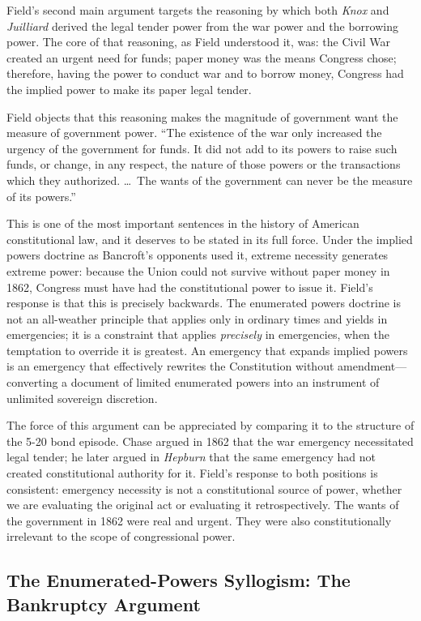 \documentclass[12pt]{article}
\begin{document}
Field's second main argument targets the reasoning by which both
\textit{Knox} and \textit{Juilliard} derived the legal tender power
from the war power and the borrowing power. The core of that reasoning,
as Field understood it, was: the Civil War created an urgent need for
funds; paper money was the means Congress chose; therefore, having the
power to conduct war and to borrow money, Congress had the implied power
to make its paper legal tender.

Field objects that this reasoning makes the magnitude of government
want the measure of government power. ``The existence of the war only
increased the urgency of the government for funds. It did not add to
its powers to raise such funds, or change, in any respect, the nature
of those powers or the transactions which they authorized. \ldots\ The
wants of the government can never be the measure of its powers.''

This is one of the most important sentences in the history of American
constitutional law, and it deserves to be stated in its full force.
Under the implied powers doctrine as Bancroft's opponents used it,
extreme necessity generates extreme power: because the Union could not
survive without paper money in 1862, Congress must have had the
constitutional power to issue it. Field's response is that this is
precisely backwards. The enumerated powers doctrine is not an all-weather
principle that applies only in ordinary times and yields in emergencies;
it is a constraint that applies \textit{precisely} in emergencies,
when the temptation to override it is greatest. An emergency that
expands implied powers is an emergency that effectively rewrites the
Constitution without amendment---converting a document of limited
enumerated powers into an instrument of unlimited sovereign discretion.

The force of this argument can be appreciated by comparing it to the
structure of the 5-20 bond episode. Chase argued in 1862 that the
war emergency necessitated legal tender; he later argued in
\textit{Hepburn} that the same emergency had not created constitutional
authority for it. Field's response to both positions is consistent:
emergency necessity is not a constitutional source of power, whether
we are evaluating the original act or evaluating it retrospectively.
The wants of the government in 1862 were real and urgent. They were
also constitutionally irrelevant to the scope of congressional power.

\subsection{The Enumerated-Powers Syllogism: The Bankruptcy Argument}
\end{document}
